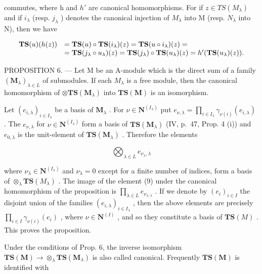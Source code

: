 commutes, where h and \(h'\) are canonical homomorphisms. For if \(z \in TS(M_{\lambda})\) and if \(i_{\lambda}\) (resp. \(j_{\lambda}\) ) denotes the canonical injection of \(M_{\lambda}\) into M (resp. \(N_{\lambda}\) into N), then we have

\[
\begin{array}{r l} \mathbf {T S} (u) (h (z)) & = \mathbf {T S} (u) \circ \mathbf {T S} (i _ {\lambda}) (z) = \mathbf {T S} (u \circ i _ {\lambda}) (z) = \\ & = \mathbf {T S} (j _ {\lambda} \circ u _ {\lambda}) (z) = \mathbf {T S} (j _ {\lambda}) \circ \mathbf {T S} (u _ {\lambda}) (z) = h ^ {\prime} (\mathbf {T S} (u _ {\lambda}) (z)). \end{array}
\]

PROPOSITION 6. --- Let M be an A-module which is the direct sum of a family \((\mathbf{M}_{\lambda})_{\lambda \in L}\) of submodules. If each \(M_{\lambda}\) is a free module, then the canonical homomorphism of \(\otimes \mathbf{TS}(\mathbf{M}_{\lambda})\) into \(\mathbf{TS}(\mathbf{M})\) is an isomorphism.

Let \((e_{i,\lambda})_{i\in I_{\lambda}}\) be a basis of \(\mathbf{M}_{\lambda}\) . For \(\nu \in \mathbf{N}^{(I_{\lambda})}\) put \(e_{\nu ,\lambda} = \prod_{i\in I_{\lambda}}\gamma_{\nu (i)}(e_{i,\lambda})\) . The \(e_{\nu ,\lambda}\) for \(\nu \in \mathbf{N}^{(I_{\lambda})}\) form a basis of \(\mathbf{TS}(\mathbf{M}_{\lambda})\) (IV, p.~47, Prop. 4 (i)) and \(e_{0,\lambda}\) is the unit-element of \(\mathbf{TS}(\mathbf{M}_{\lambda})\) . Therefore the elements

\[
\bigotimes_ {\lambda \in L} e _ {\nu_ {\lambda}, \lambda}\tag{9}
\]

where \(\nu_{\lambda} \in \mathbf{N}^{(I_{\lambda})}\) and \(\nu_{\lambda} = 0\) except for a finite number of indices, form a basis of \(\otimes_{\lambda} \mathbf{TS}(M_{\lambda})\) . The image of the element (9) under the canonical homomorphism of the proposition is \(\prod_{\lambda \in L} e_{\nu_{\lambda,\lambda}}\) . If we denote by \((e_i)_{i \in I}\) the disjoint union of the families \((e_{i,\lambda})_{i \in I_{\lambda}}\) , then the above elements are precisely \(\prod_{i \in I} \gamma_{\nu(i)}(e_i)\) , where \(\nu \in \mathbf{N}^{(I)}\) , and so they constitute a basis of \(\mathbf{TS}(M)\) . This proves the proposition.

Under the conditions of Prop. 6, the inverse isomorphism \(\mathbf{TS}(\mathbf{M}) \to \otimes_{\lambda} \mathbf{TS}(\mathbf{M}_{\lambda})\) is also called canonical. Frequently \(\mathbf{TS}(\mathbf{M})\) is identified with

